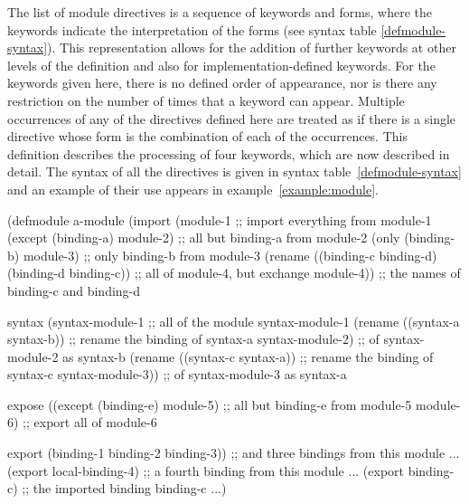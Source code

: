 \begin{optDefinition}
The list of module directives is a sequence of keywords and forms, where the
keywords indicate the interpretation of the forms (see syntax table
\ref{defmodule-syntax}). This representation allows for the addition of further
keywords at other levels of the definition and also for implementation-defined
keywords.  For the
keywords given here, there is no defined order of appearance, nor is there any
restriction on the number of times that a keyword can appear.  Multiple
occurrences of any of the directives defined here are treated as if there is a
single directive whose form is the combination of each of the occurrences.  This
definition describes the processing of four keywords, which are now described in
detail.  The syntax of all the directives is given in syntax
table~\ref{defmodule-syntax} and an example of their use appears in
example~\ref{example:module}.
%
\begin{figure*}[t]
\begin{example}
\label{example:module}
\begin{center}
\begin{minipage}[t]{\textwidth}{
\syntax
(defmodule a-module
  (import
    (module-1                                        ;; import everything from module-1
     (except (binding-a) module-2)                   ;; all but binding-a from module-2
     (only (binding-b) module-3)                     ;; only binding-b from module-3
     (rename
      ((binding-c binding-d) (binding-d binding-c))  ;; all of module-4, but exchange
      module-4))                                     ;; the names of binding-c and binding-d

   syntax
    (syntax-module-1                                 ;; all of the module syntax-module-1
     (rename ((syntax-a syntax-b))                   ;; rename the binding of syntax-a
      syntax-module-2)                               ;; of syntax-module-2 as syntax-b
     (rename ((syntax-c syntax-a))                   ;; rename the binding of syntax-c
      syntax-module-3))                              ;; of syntax-module-3 as syntax-a

   expose
    ((except (binding-e) module-5)                   ;; all but binding-e from module-5
     module-6)                                       ;; export all of module-6

   export
    (binding-1 binding-2 binding-3))                 ;; and three bindings from this module
  ...
  (export local-binding-4)                           ;; a fourth binding from this module
  ...
  (export binding-c)                                 ;; the imported binding binding-c
  ...)
\endsyntax
}
\end{minipage}
\end{center}
\end{example}
\end{figure*}
%
\end{optDefinition}
